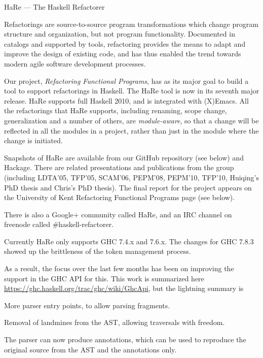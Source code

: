 \begin{hcarentry}[updated]{HaRe --- The Haskell Refactorer}
\label{hare}
\makeheader

Refactorings are source-to-source program transformations which change
program structure and organization, but not program functionality.
Documented in catalogs and supported by tools, refactoring provides
the means to adapt and improve the design of existing code, and has
thus enabled the trend towards modern agile software development
processes.

Our project, \emph{Refactoring Functional Programs}, has as its major
goal to build a tool to support refactorings in Haskell. The HaRe tool
is now in its seventh major release. HaRe supports full Haskell 2010,
and is integrated with (X)Emacs. All the refactorings that HaRe
supports, including renaming, scope change, generalization and a
number of others, are \emph{module-aware}, so that a change will be
reflected in all the modules in a project, rather than just in the
module where the change is initiated.

Snapshots of HaRe are available from our GitHub repository (see below)
and Hackage. There are related presentations and publications from the
group (including LDTA'05, TFP'05, SCAM'06, PEPM'08, PEPM'10, TFP'10,
Huiqing's PhD thesis and Chris's PhD thesis). The final report for the
project appears on the University of Kent Refactoring Functional
Programs page (see below).

There is also a Google+ community called HaRe, and an IRC channel on
freenode called \#haskell-refactorer.

Currently HaRe only supports GHC 7.4.x and 7.6.x. The changes for GHC
7.8.3 showed up the brittleness of the token management process.

As a result, the focus over the last few months has been on improving
the support in the GHC API for this. This work is summarized here
\url{https://ghc.haskell.org/trac/ghc/wiki/GhcApi}, but
the lightning summary is

\begin{compactitem}

\item More parser entry points, to allow parsing fragments.
\item Removal of landmines from the AST, allowing traversals with
  freedom.
\item The parser can now produce annotations, which can be used to
  reproduce the original source from the AST and the annotations only.


\end{compactitem}
\end{hcarentry}
